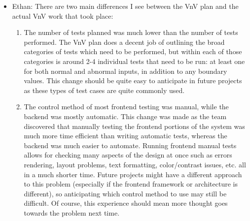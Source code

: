 \documentclass[12pt, titlepage]{article}
\begin{document}
\begin{itemize}
    \item Ethan: There are two main differences I see between the VnV plan and the actual VnV work that took place:
        \begin{enumerate}
            \item The number of tests planned was much lower than the number of tests performed. The VnV plan does a decent job of outlining the broad categories of tests which need to be performed, but within each of those categories is around 2-4 individual tests that need to be run: at least one for both normal and abnormal inputs, in addition to any boundary values. This change should be quite easy to anticipate in future projects as these types of test cases are quite commonly used.
            \item The control method of most frontend testing was manual, while the backend was mostly automatic. This change was made as the team discovered that manually testing the frontend portions of the system was much more time efficient than writing automatic tests, whereas the backend was much easier to automate. Running frontend manual tests allows for checking many aspects of the design at once such as errors rendering, layout problems, text formatting, color/contrast issues, etc. all in a much shorter time. Future projects might have a different approach to this problem (especially if the frontend framework or architecture is different), so anticipating which control method to use may still be difficult. Of course, this experience should mean more thought goes towards the problem next time.
        \end{enumerate}
\end{itemize}
\end{document}
